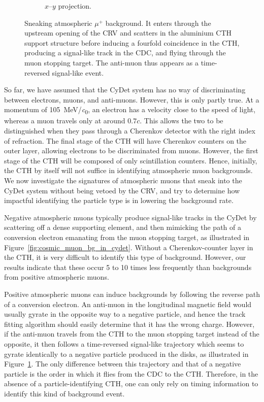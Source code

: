\begin{figure}
\begin{subfigure}{0.43\textwidth}
        \caption{$x$--$y$ projection.}
    \end{subfigure}
    \caption[Sneaking atmospheric $\mu^+$ background event]{ Sneaking
        atmospheric $\mu^+$ background. It enters through the upstream opening
        of the CRV and scatters in the aluminium CTH support structure before
        inducing a fourfold coincidence in the CTH, producing a signal-like
        track in the CDC, and flying through the muon stopping target. The
        anti-muon thus appears as a time-reversed signal-like event. }
    \label{fig:cosmic_antimuon_bg_in_cydet}
\end{figure}


So far, we have assumed that the CyDet system has no way of discriminating
between electrons, muons, and anti-muons. However, this is only partly true. At
a momentum of \SI{105}{\MeV/\clight}, an electron has a velocity close to the speed of
light, whereas a muon travels only at around $0.7 c$. This allows the two to be
distinguished when they pass through a Cherenkov detector with the right index
of refraction. The final stage of the CTH will have Cherenkov counters on the
outer layer, allowing electrons to be discriminated from muons. However, the
first stage of the CTH will be composed of only scintillation counters. Hence,
initially, the CTH by itself will not suffice in identifying atmospheric muon
backgrounds. We now investigate the signatures of atmospheric muons that sneak
into the CyDet system without being vetoed by the CRV, and try to determine how
impactful identifying the particle type is in lowering the background rate.



Negative atmospheric muons typically produce signal-like tracks in the CyDet by
scattering off a dense supporting element, and then mimicking the path of a
conversion electron emanating from the muon stopping target, as illustrated in
Figure~\ref{fig:cosmic_muon_bg_in_cydet}. Without a Cherenkov-counter layer in
the CTH, it is very difficult to identify this type of background. However, our
results indicate that these occur 5 to 10 times less frequently than backgrounds
from positive atmospheric muons.

Positive atmospheric muons can induce backgrounds by following the reverse path
of a conversion electron. An anti-muon in the longitudinal magnetic field would
usually gyrate in the opposite way to a negative particle, and hence the track
fitting algorithm should easily determine that it has the wrong charge. However,
if the anti-muon travels from the CTH to the muon stopping target instead of the
opposite, it then follows a time-reversed signal-like trajectory which seems to
gyrate identically to a negative particle produced in the disks, as illustrated
in Figure~\ref{fig:cosmic_antimuon_bg_in_cydet}. The only difference between
this trajectory and that of a negative particle is the order in which it flies
from the CDC to the CTH. Therefore, in the absence of a particle-identifying
CTH, one can only rely on timing information to identify this kind of background
event.

